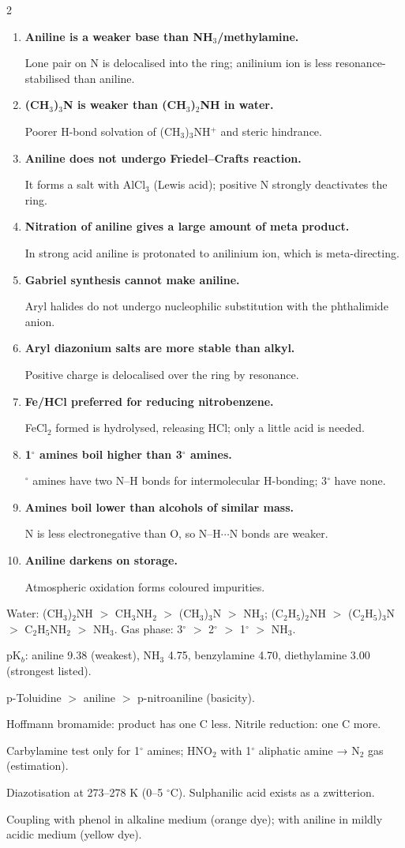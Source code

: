 \documentclass[10pt,a4paper]{extarticle}
\newenvironment{rqlist}{\begin{enumerate}[leftmargin=12pt,label={\sffamily\bfseries\scriptsize\color{uc}\arabic*.},itemsep=1pt]}{\end{enumerate}}
\newcommand{\ans}{\par\hspace*{2pt}{\color{uc}$\hookrightarrow$}\;}
\begin{document}
\begin{multicols}{2}
\begin{rqlist}
\item \textbf{Aniline is a weaker base than NH$_3$/methylamine.}\ans Lone pair on N is delocalised into the ring; anilinium ion is less resonance-stabilised than aniline.
\item \textbf{(CH$_3$)$_3$N is weaker than (CH$_3$)$_2$NH in water.}\ans Poorer H-bond solvation of (CH$_3$)$_3$NH$^+$ and steric hindrance.
\item \textbf{Aniline does not undergo Friedel--Crafts reaction.}\ans It forms a salt with AlCl$_3$ (Lewis acid); positive N strongly deactivates the ring.
\item \textbf{Nitration of aniline gives a large amount of meta product.}\ans In strong acid aniline is protonated to anilinium ion, which is meta-directing.
\item \textbf{Gabriel synthesis cannot make aniline.}\ans Aryl halides do not undergo nucleophilic substitution with the phthalimide anion.
\item \textbf{Aryl diazonium salts are more stable than alkyl.}\ans Positive charge is delocalised over the ring by resonance.
\item \textbf{Fe/HCl preferred for reducing nitrobenzene.}\ans FeCl$_2$ formed is hydrolysed, releasing HCl; only a little acid is needed.
\item \textbf{1$^\circ$ amines boil higher than 3$^\circ$ amines.}\ans 1$^\circ$ amines have two N--H bonds for intermolecular H-bonding; 3$^\circ$ have none.
\item \textbf{Amines boil lower than alcohols of similar mass.}\ans N is less electronegative than O, so N--H$\cdots$N bonds are weaker.
\item \textbf{Aniline darkens on storage.}\ans Atmospheric oxidation forms coloured impurities.
\end{rqlist}

\begin{fl}
\item Water: (CH$_3$)$_2$NH $>$ CH$_3$NH$_2$ $>$ (CH$_3$)$_3$N $>$ NH$_3$; (C$_2$H$_5$)$_2$NH $>$ (C$_2$H$_5$)$_3$N $>$ C$_2$H$_5$NH$_2$ $>$ NH$_3$. Gas phase: 3$^\circ$ $>$ 2$^\circ$ $>$ 1$^\circ$ $>$ NH$_3$.
\item pK$_b$: aniline 9.38 (weakest), NH$_3$ 4.75, benzylamine 4.70, diethylamine 3.00 (strongest listed).
\item p-Toluidine $>$ aniline $>$ p-nitroaniline (basicity).
\item Hoffmann bromamide: product has one C less. Nitrile reduction: one C more.
\item Carbylamine test only for 1$^\circ$ amines; HNO$_2$ with 1$^\circ$ aliphatic amine → N$_2$ gas (estimation).
\item Diazotisation at 273--278 K (0--5 $^\circ$C). Sulphanilic acid exists as a zwitterion.
\item Coupling with phenol in alkaline medium (orange dye); with aniline in mildly acidic medium (yellow dye).
\end{fl}


\end{multicols}
\end{document}
